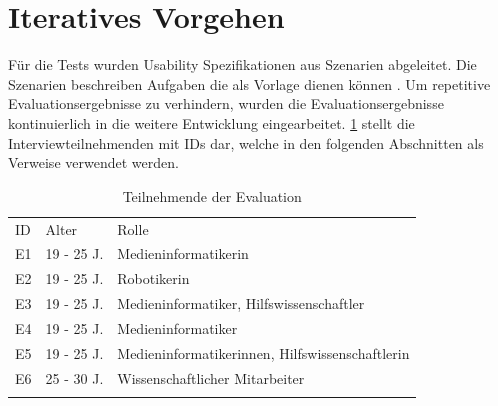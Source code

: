 \section{Iteratives Vorgehen}
Für die Tests wurden Usability Spezifikationen aus Szenarien abgeleitet. Die Szenarien beschreiben
Aufgaben die als Vorlage dienen können . Um repetitive Evaluationsergebnisse zu verhindern, wurden
die Evaluationsergebnisse kontinuierlich in die weitere Entwicklung eingearbeitet. \ref{table:e}
stellt die Interviewteilnehmenden  mit IDs dar, welche in den folgenden Abschnitten als Verweise
verwendet werden.

\begin{table}[h]
    \centering
    \caption{Teilnehmende der Evaluation}
    \begin{tabular}{lll}
        \arrayrulecolor{maincolor}\hline
        \sffamily\color{maincolor}ID & \sffamily\color{maincolor}Alter &
        \sffamily\color{maincolor}Rolle                                                                           \\
        \arrayrulecolor{maincolor}\hline
        E1                           & 19 - 25 J.                      &
        Medieninformatikerin                                                                                      \\
        E2                           & 19 - 25 J.                      & Robotikerin                              \\
        E3                           & 19 - 25 J.                      & Medieninformatiker, Hilfswissenschaftler \\
        E4                           & 19 - 25 J.                      & Medieninformatiker                       \\
        E5                           & 19 - 25 J.                      &
        Medieninformatikerinnen, Hilfswissenschaftlerin                                                           \\
        E6                           & 25 - 30 J.                      & Wissenschaftlicher Mitarbeiter           \\
        \arrayrulecolor{maincolor}\hline
    \end{tabular}
    \label{table:e}
\end{table}

